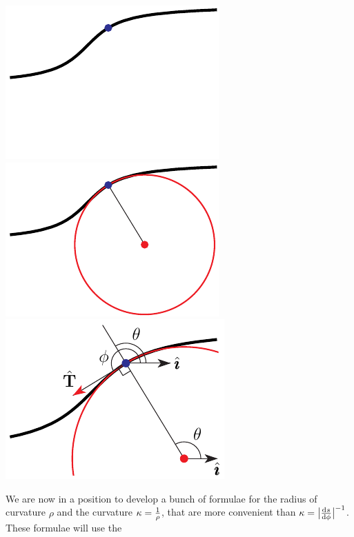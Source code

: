 \begin{wfig}
\begin{center}
     \includegraphics{curvatureB1.pdf}\hskip-20pt
     \includegraphics{curvatureB2.pdf}\qquad
     \includegraphics{curvatureB.pdf}
\end{center}
\end{wfig}
We are now in a position to develop a bunch of formulae for the radius
of curvature $\rho$ and the curvature $\kappa=\frac{1}{\rho}$, that are more 
convenient than $\ka = \big|\diff{s}{\phi}\big|^{-1}$. These formulae
will use the 
